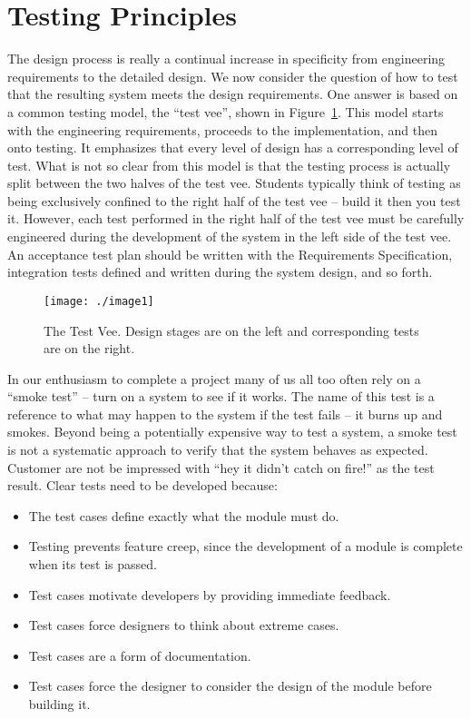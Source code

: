 \section{Testing Principles}
\label{section:testing-principles}

The design process is really a continual increase in specificity from
engineering requirements to the detailed design. We now consider the
question of how to test that the resulting system meets the design
requirements. One answer is based on a common testing model, the ``test
vee'', shown in Figure~\ref{figure:testVee}. 
This model starts with the engineering
requirements, proceeds to the implementation, and then onto testing. It
emphasizes that every level of design has a corresponding level of test.
What is not so clear from this model is that the testing process is
actually split between the two halves of the test vee. Students
typically think of testing as being exclusively confined to the right
half of the test vee -- build it then you test it. However, each test
performed in the right half of the test vee must be carefully engineered
during the development of the system in the left side of the test vee.
An acceptance test plan should be written with the Requirements
Specification, integration tests defined and written during the system
design, and so forth.

\begin{figure}
\texttt{[image: ./image1]}
\caption{The Test Vee. Design stages are on the left and
corresponding tests are on the right.}
\label{figure:testVee}
\end{figure}

In our enthusiasm to complete a project many of us all too often rely on
a ``smoke test'' -- turn on a system to see if it works. The name of
this test is a reference to what may happen to the system if the test
fails -- it burns up and smokes. Beyond being a potentially expensive
way to test a system, a smoke test is not a systematic approach to
verify that the system behaves as expected. Customer are not be
impressed with ``hey it didn't catch on fire!'' as the test result.
Clear tests need to be developed because:

\begin{itemize}
\item
  The test cases define exactly what the module must do.
\item
  Testing prevents feature creep, since the development of a module is
  complete when its test is passed.
\item
  Test cases motivate developers by providing immediate feedback.
\item
  Test cases force designers to think about extreme cases.
\item
  Test cases are a form of documentation.
\item
  Test cases force the designer to consider the design of the module
  before building it.
\end{itemize}

